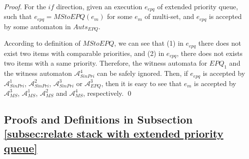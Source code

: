 {\begin {proof}
For the $\textit{if}$ direction, given an execution $e_{\textit{epq}}$ of extended priority queue, such that $e_{\textit{epq}} = \textit{MStoEPQ}(e_m)$ for some $e_m$ of multi-set, and $e_{\textit{epq}}$ is accepted by some automaton in $\textit{Auts}_{\textit{EPQ}}$.

According to definition of $\textit{MStoEPQ}$, we can see that (1) in $e_{\textit{epq}}$ there does not exist two items with comparable priorities, and (2) in $e_{\textit{epq}}$, there does not exists two items with a same priority. Therefore, the witness automata for $\textit{EPQ}_1$ and the witness automaton $\mathcal{A}_{\textit{SinPri}}^4$ can be safely ignored. Then, if $e_{\textit{epq}}$ is accepted by $\mathcal{A}_{\textit{SinPri}}^1$, $\mathcal{A}_{\textit{SinPri}}^2$, $\mathcal{A}_{\textit{SinPri}}^3$ or $\mathcal{A}_{\textit{EPQ}}^3$, then it is easy to see that $e_m$ is accepted by $\mathcal{A}_{\textit{MS}}^3$, $\mathcal{A}_{\textit{MS}}^1$, $\mathcal{A}_{\textit{MS}}^2$ and $\mathcal{A}_{\textit{MS}}^4$, respectively. \qed
\end {proof}



\subsection{Proofs and Definitions in Subsection \ref{subsec:relate stack with extended priority queue}}
\label{subsec:appendix proof and definition in section relate stack with extended priority queue}
}





